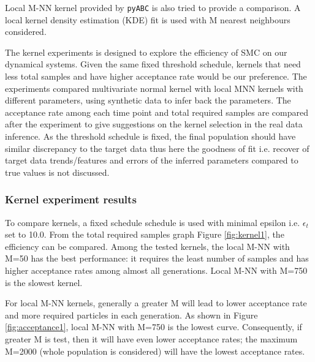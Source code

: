 \documentclass[12pt,a4paper]{report}
\begin{document}
Local M-NN kernel provided by \verb|pyABC| is also tried to provide a comparison. A local kernel density estimation (KDE) fit is used with M nearest neighbours considered.

The kernel experiments is designed to explore the efficiency of SMC on our dynamical systems. Given the same fixed threshold schedule, kernels that need less total samples and have higher acceptance rate would be our preference. The experiments compared multivariate normal kernel with local MNN kernels with different parameters, using synthetic data to infer back the parameters. The acceptance rate among each time point and total required samples are compared after the experiment to give suggestions on the kernel selection in the real data inference. As the threshold schedule is fixed, the final population should have similar discrepancy to the target data thus here the goodness of fit i.e. recover of target data trends/features and errors of the inferred parameters compared to true values is not discussed.

\subsubsection{Kernel experiment results}

To compare kernels, a fixed schedule schedule is used with minimal epsilon i.e. $\epsilon_t$ set to 10.0. From the total required samples graph Figure \ref{fig:kernel1}, the efficiency can be compared. Among the tested kernels, the local M-NN with M=50 has the best performance: it requires the least number of samples and 
has higher acceptance rates among almost all generations. Local M-NN with M=750 is the slowest kernel.

For local M-NN kernels, generally a greater M will lead to lower acceptance rate and 
more required particles in each generation. As shown in Figure \ref{fig:acceptance1}, local M-NN with M=750 is the lowest curve. Consequently, if greater M is test, then it will have even lower acceptance rates; the maximum M=2000 (whole population is considered) will have the lowest acceptance rates.
\end{document}
